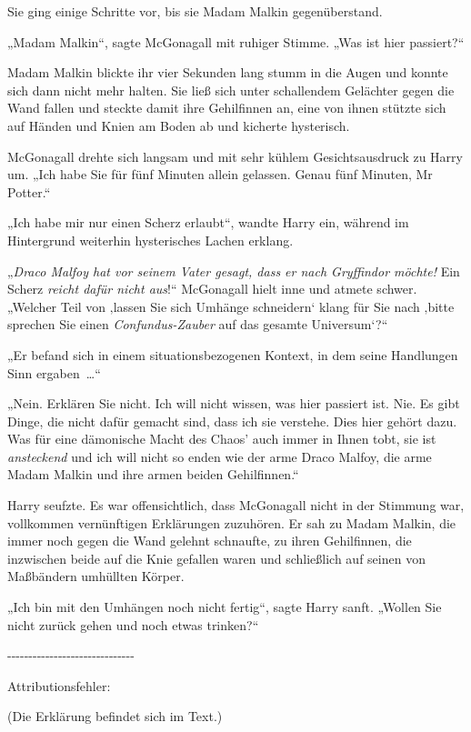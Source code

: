 {Sie ging einige Schritte vor, bis sie Madam Malkin gegenüberstand.

„Madam Malkin“, sagte McGonagall mit ruhiger Stimme. „Was ist hier passiert?“

Madam Malkin blickte ihr vier Sekunden lang stumm in die Augen und konnte sich dann nicht mehr halten. Sie ließ sich unter schallendem Gelächter gegen die Wand fallen und steckte damit ihre Gehilfinnen an, eine von ihnen stützte sich auf Händen und Knien am Boden ab und kicherte hysterisch.

McGonagall drehte sich langsam und mit sehr kühlem Gesichtsausdruck zu Harry um. „Ich habe Sie für fünf Minuten allein gelassen. Genau fünf Minuten, Mr Potter.“

„Ich habe mir nur einen Scherz erlaubt“, wandte Harry ein, während im Hintergrund weiterhin hysterisches Lachen erklang.

„\emph{Draco Malfoy hat vor seinem Vater gesagt, dass er nach Gryffindor möchte!} Ein Scherz \emph{reicht dafür nicht aus}!“ McGonagall hielt inne und atmete schwer. „Welcher Teil von ‚lassen Sie sich Umhänge schneidern` klang für Sie nach ‚bitte sprechen Sie einen \emph{Confundus-Zauber} auf das gesamte Universum`?“

„Er befand sich in einem situationsbezogenen Kontext, in dem seine Handlungen Sinn ergaben~…“

„Nein. Erklären Sie nicht. Ich will nicht wissen, was hier passiert ist. Nie. Es gibt Dinge, die nicht dafür gemacht sind, dass ich sie verstehe. Dies hier gehört dazu. Was für eine dämonische Macht des Chaos' auch immer in Ihnen tobt, sie ist \emph{ansteckend} und ich will nicht so enden wie der arme Draco Malfoy, die arme Madam Malkin und ihre armen beiden Gehilfinnen.“

Harry seufzte. Es war offensichtlich, dass McGonagall nicht in der Stimmung war, vollkommen vernünftigen Erklärungen zuzuhören. Er sah zu Madam Malkin, die immer noch gegen die Wand gelehnt schnaufte, zu ihren Gehilfinnen, die inzwischen beide auf die Knie gefallen waren und schließlich auf seinen von Maßbändern umhüllten Körper.

„Ich bin mit den Umhängen noch nicht fertig“, sagte Harry sanft. „Wollen Sie nicht zurück gehen und noch etwas trinken?“

-\/-\/-\/-\/-\/-\/-\/-\/-\/-\/-\/-\/-\/-\/-\/-\/-\/-\/-\/-\/-\/-\/-\/-\/-\/-\/-\/-\/-\/-

Attributionsfehler:

(Die Erklärung befindet sich im Text.)

}
